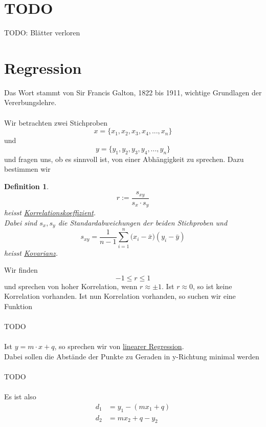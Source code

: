 \documentclass{report}
\newtheorem{mydef}{Definition}
\begin{document}
\section{TODO}
TODO: Blätter verloren

\section{Regression}
Das Wort stammt von Sir Francis Galton, 1822 bis 1911, wichtige Grundlagen der Vererbungslehre.\\\\
Wir betrachten zwei Stichproben
\begin{equation}
x = \{ x_1, x_2, x_3, x_4, ..., x_n\}
\end{equation}
und
\begin{equation}
y = \{ y_1, y_2, y_3, y_4, ..., y_n\}
\end{equation}
und fragen uns, ob es sinnvoll ist, von einer Abhängigkeit zu sprechen. Dazu bestimmen wir
\begin{mydef}
\begin{equation}
r := \frac{s_{xy}}{s_x \cdot s_y}
\end{equation}
heisst \underline{Korrelationskoeffizient}.\\
Dabei sind $s_x, s_y$ die Standardabweichungen der beiden Stichproben und
\begin{equation}
s_{xy} = \frac{1}{n-1} \sum_{i=1}^{n}{(x_i - \bar{x}})(y_i - \bar{y})
\end{equation}
heisst \underline{Kovarianz}.
\end{mydef}
Wir finden
\begin{equation}
-1 \leq r \leq 1
\end{equation}
und sprechen von hoher Korrelation, wenn $r \approx \pm 1$. Ist $r \approx 0$, so ist keine Korrelation vorhanden. Ist nun Korrelation vorhanden, so suchen wir eine Funktion
\\\\TODO\\\\
Ist $y = m \cdot x + q$, so sprechen wir von \underline{linearer Regression}.\\
Dabei sollen die Abstände der Punkte zu Geraden in y-Richtung minimal werden
\\\\TODO\\\\
Es ist also
\begin{align*}
d_1 &= y_1 - (mx_1 + q)\\
d_2 &= mx_2 + q - y_2
\end{align*}
\end{document}
